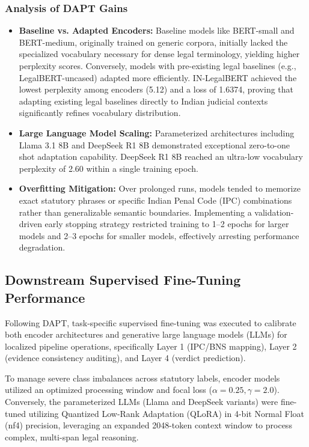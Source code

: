 \subsubsection{Analysis of DAPT Gains}
\begin{itemize}
	\item \textbf{Baseline vs. Adapted Encoders:} Baseline models like BERT-small and BERT-medium, originally trained on generic corpora, initially lacked the specialized vocabulary necessary for dense legal terminology, yielding higher perplexity scores. Conversely, models with pre-existing legal baselines (e.g., LegalBERT-uncased) adapted more efficiently. IN-LegalBERT achieved the lowest perplexity among encoders (5.12) and a loss of 1.6374, proving that adapting existing legal baselines directly to Indian judicial contexts significantly refines vocabulary distribution.
	\item \textbf{Large Language Model Scaling:} Parameterized architectures including Llama 3.1 8B and DeepSeek R1 8B demonstrated exceptional zero-to-one shot adaptation capability. DeepSeek R1 8B reached an ultra-low vocabulary perplexity of 2.60 within a single training epoch.
	\item \textbf{Overfitting Mitigation:} Over prolonged runs, models tended to memorize exact statutory phrases or specific Indian Penal Code (IPC) combinations rather than generalizable semantic boundaries. Implementing a validation-driven early stopping strategy restricted training to 1--2 epochs for larger models and 2--3 epochs for smaller models, effectively arresting performance degradation.
\end{itemize}





\subsection{Downstream Supervised Fine-Tuning Performance}
Following DAPT, task-specific supervised fine-tuning was executed to calibrate both encoder architectures and generative large language models (LLMs) for localized pipeline operations, specifically Layer 1 (IPC/BNS mapping), Layer 2 (evidence consistency auditing), and Layer 4 (verdict prediction). 

To manage severe class imbalances across statutory labels, encoder models utilized an optimized processing window and focal loss ($\alpha=0.25, \gamma=2.0$). Conversely, the parameterized LLMs (Llama and DeepSeek variants) were fine-tuned utilizing Quantized Low-Rank Adaptation (QLoRA) in 4-bit Normal Float (nf4) precision, leveraging an expanded 2048-token context window to process complex, multi-span legal reasoning.


